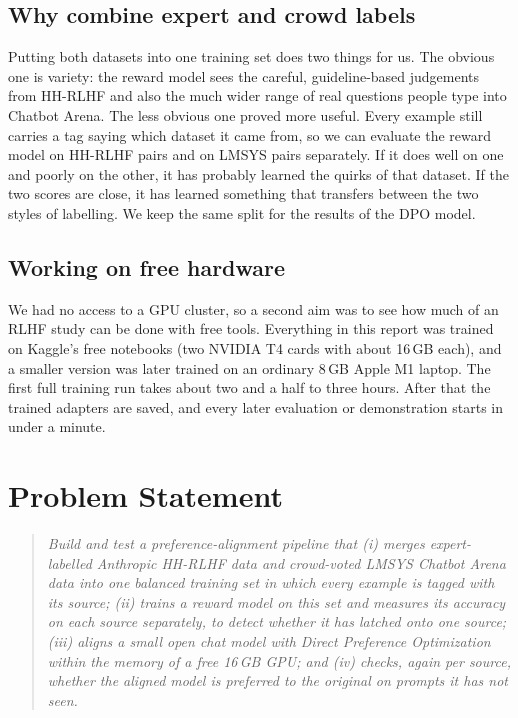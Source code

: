 \subsection{Why combine expert and crowd labels}
Putting both datasets into one training set does two things for us. The obvious one is variety: the reward model sees the careful, guideline-based judgements from HH-RLHF and also the much wider range of real questions people type into Chatbot Arena. The less obvious one proved more useful. Every example still carries a tag saying which dataset it came from, so we can evaluate the reward model on HH-RLHF pairs and on LMSYS pairs separately. If it does well on one and poorly on the other, it has probably learned the quirks of that dataset. If the two scores are close, it has learned something that transfers between the two styles of labelling. We keep the same split for the results of the DPO model.

\subsection{Working on free hardware}
We had no access to a GPU cluster, so a second aim was to see how much of an RLHF study can be done with free tools. Everything in this report was trained on Kaggle's free notebooks (two NVIDIA T4 cards with about 16\,GB each), and a smaller version was later trained on an ordinary 8\,GB Apple M1 laptop. The first full training run takes about two and a half to three hours. After that the trained adapters are saved, and every later evaluation or demonstration starts in under a minute.

\section{Problem Statement}
\label{sec:problem}

\begin{quote}
\itshape
Build and test a preference-alignment pipeline that (i) merges expert-labelled Anthropic HH-RLHF data and crowd-voted LMSYS Chatbot Arena data into one balanced training set in which every example is tagged with its source; (ii) trains a reward model on this set and measures its accuracy on each source separately, to detect whether it has latched onto one source; (iii) aligns a small open chat model with Direct Preference Optimization within the memory of a free 16\,GB GPU; and (iv) checks, again per source, whether the aligned model is preferred to the original on prompts it has not seen.
\end{quote}

